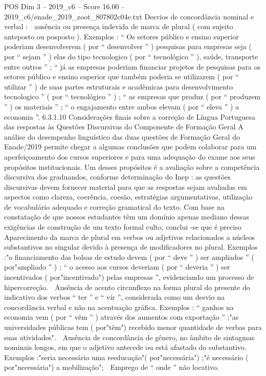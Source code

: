 \begin{textsample}{POS Dim 3 – 2019\_c6 – Score 16.00 – 2019\_c6/enade\_2019\_zoot\_807802c04e.txt}
Desvios de concordância nominal e verbal :  ausência ou presença indevida de marca de plural ( com sujeito anteposto ou posposto ).
Exemplos : “ Os setores público e ensino superior poderiam desenvolverem ( por “ desenvolver ” ) pesquisas para empresas seja ( por “ sejam ” ) elas do tipo tecnologico ( por “ tecnológico ” ), saúde, transporte entre outros ” ; “ já as empresas poderiam financiar projetos de pesquisas para os setores público e ensino superior que também poderia se utilizarem ( por “ utilizar ” ) de suas partes estruturais e acadêmicas para desenvolvimento tecnologico ” ( por “ tecnológico ” ) ; “ as empresas que produz ( por “ produzem ” ) os materiais ” ; “ o engajamento entre ambos elevam ( por “ eleva ” ) a economia ”. 6.3.1.10 Considerações finais sobre a correção de Língua Portuguesa das respostas às Questões Discursivas do Componente de Formação Geral A análise do desempenho linguístico das duas questões de Formação Geral do Enade/2019 permite chegar a algumas conclusões que podem colaborar para um aperfeiçoamento dos cursos superiores e para uma adequação do exame aos seus propósitos institucionais.
Um desses propósitos é a avaliação sobre a competência discursiva dos graduandos, conforme determinação do Inep : as questões discursivas devem fornecer material para que as respostas sejam avaliadas em aspectos como clareza, coerência, coesão, estratégias argumentativas, utilização de vocabulário adequado e correção gramatical do texto.
Com base na constatação de que nossos estudantes têm um domínio apenas mediano dessas exigências de construção de um texto formal culto, conclui -se que é preciso  Aparecimento da marca de plural em verbos ou adjetivos relacionados a núcleos substantivos no singular devido à presença de modificadores no plural.
Exemplos :"o financiamento das bolsas de estudo devem ( por “ deve ” ) ser ampliados ” ( por"ampliado ” ) ; “ o acesso aos cursos deveriam ( por “ deveria ” ) ser incentivados ( por"incentivado") pelas empresas ”, evidenciando um processo de hipercorreção.  Ausência de acento circunflexo na forma plural do presente do indicativo dos verbos “ ter ” e “ vir ”, considerada como um desvio na concordância verbal e não na acentuação gráfica.
Exemplos : “ ganhos na economia vem ( por “ vêm ” ) através dos aumentos com exportação ” ;"as universidades públicas tem ( por"têm") recebido menor quantidade de verbas para suas atividades".  Ausência de concordância de gênero, no âmbito de sintagmas nominais longos, em que o adjetivo antecede ou está afastado do substantivo.
Exemplos :"seria necessário uma reeducação"( por"necessária") ;"é necessário ( por"necessária") a mobilização";  Emprego de “ onde ” não locativo.

\end{textsample}
